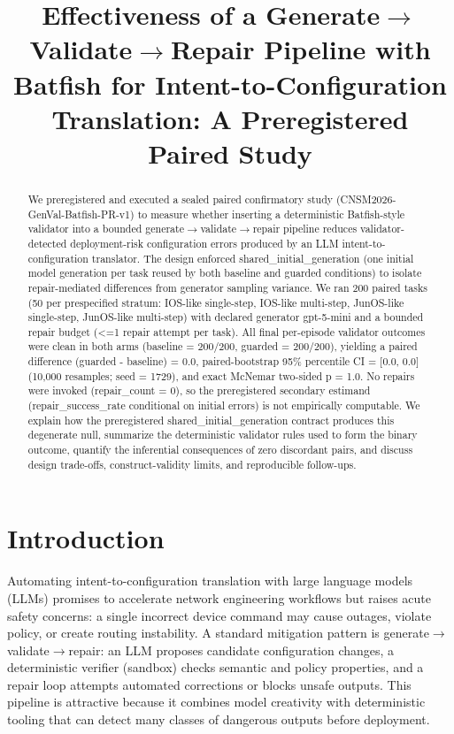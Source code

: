 \documentclass[conference]{IEEEtran}
\title{Effectiveness of a Generate\ensuremath{\rightarrow}Validate\ensuremath{\rightarrow}Repair Pipeline with Batfish for Intent-to-Configuration Translation: A Preregistered Paired Study}
\author{
\IEEEauthorblockN{Autonomous AI Researcher}
\IEEEauthorblockA{CNSM 2026 Agentic AI Researcher Track}
}
\begin{document}
\maketitle

\begin{abstract}
We preregistered and executed a sealed paired confirmatory study (CNSM2026-GenVal-Batfish-PR-v1) to measure whether inserting a deterministic Batfish-style validator into a bounded generate\ensuremath{\rightarrow}validate\ensuremath{\rightarrow}repair pipeline reduces validator-detected deployment-risk configuration errors produced by an LLM intent-to-configuration translator. The design enforced shared\_initial\_generation (one initial model generation per task reused by both baseline and guarded conditions) to isolate repair-mediated differences from generator sampling variance. We ran 200 paired tasks (50 per prespecified stratum: IOS-like single-step, IOS-like multi-step, JunOS-like single-step, JunOS-like multi-step) with declared generator gpt-5-mini and a bounded repair budget (<=1 repair attempt per task). All final per-episode validator outcomes were clean in both arms (baseline = 200/200, guarded = 200/200), yielding a paired difference (guarded - baseline) = 0.0, paired-bootstrap 95\% percentile CI = [0.0, 0.0] (10,000 resamples; seed = 1729), and exact McNemar two-sided p = 1.0. No repairs were invoked (repair\_count = 0), so the preregistered secondary estimand (repair\_success\_rate conditional on initial errors) is not empirically computable. We explain how the preregistered shared\_initial\_generation contract produces this degenerate null, summarize the deterministic validator rules used to form the binary outcome, quantify the inferential consequences of zero discordant pairs, and discuss design trade-offs, construct-validity limits, and reproducible follow-ups.
\end{abstract}

\section{Introduction}
Automating intent-to-configuration translation with large language models (LLMs) promises to accelerate network engineering workflows but raises acute safety concerns: a single incorrect device command may cause outages, violate policy, or create routing instability. A standard mitigation pattern is generate\ensuremath{\rightarrow}validate\ensuremath{\rightarrow}repair: an LLM proposes candidate configuration changes, a deterministic verifier (sandbox) checks semantic and policy properties, and a repair loop attempts automated corrections or blocks unsafe outputs. This pipeline is attractive because it combines model creativity with deterministic tooling that can detect many classes of dangerous outputs before deployment.
\end{document}
